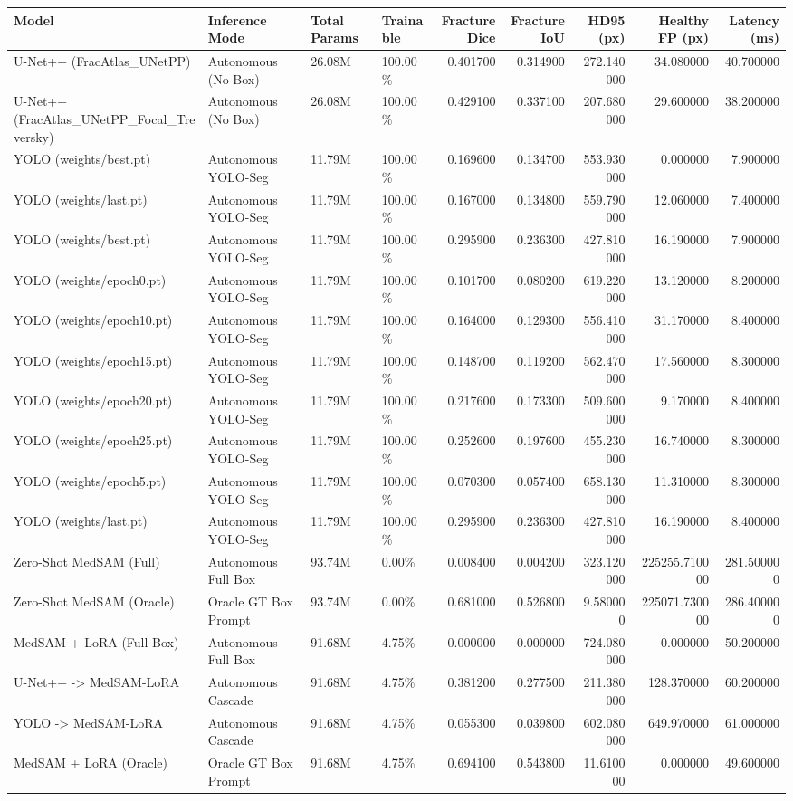 \begin{tabular}{llllrrrrr}
\toprule
Model & Inference Mode & Total Params & Trainable & Fracture Dice & Fracture IoU & HD95 (px) & Healthy FP (px) & Latency (ms) \\
\midrule
U-Net++ (FracAtlas\_UNetPP) & Autonomous (No Box) & 26.08M & 100.00\% & 0.401700 & 0.314900 & 272.140000 & 34.080000 & 40.700000 \\
U-Net++ (FracAtlas\_UNetPP\_Focal\_Treversky) & Autonomous (No Box) & 26.08M & 100.00\% & 0.429100 & 0.337100 & 207.680000 & 29.600000 & 38.200000 \\
YOLO (weights/best.pt) & Autonomous YOLO-Seg & 11.79M & 100.00\% & 0.169600 & 0.134700 & 553.930000 & 0.000000 & 7.900000 \\
YOLO (weights/last.pt) & Autonomous YOLO-Seg & 11.79M & 100.00\% & 0.167000 & 0.134800 & 559.790000 & 12.060000 & 7.400000 \\
YOLO (weights/best.pt) & Autonomous YOLO-Seg & 11.79M & 100.00\% & 0.295900 & 0.236300 & 427.810000 & 16.190000 & 7.900000 \\
YOLO (weights/epoch0.pt) & Autonomous YOLO-Seg & 11.79M & 100.00\% & 0.101700 & 0.080200 & 619.220000 & 13.120000 & 8.200000 \\
YOLO (weights/epoch10.pt) & Autonomous YOLO-Seg & 11.79M & 100.00\% & 0.164000 & 0.129300 & 556.410000 & 31.170000 & 8.400000 \\
YOLO (weights/epoch15.pt) & Autonomous YOLO-Seg & 11.79M & 100.00\% & 0.148700 & 0.119200 & 562.470000 & 17.560000 & 8.300000 \\
YOLO (weights/epoch20.pt) & Autonomous YOLO-Seg & 11.79M & 100.00\% & 0.217600 & 0.173300 & 509.600000 & 9.170000 & 8.400000 \\
YOLO (weights/epoch25.pt) & Autonomous YOLO-Seg & 11.79M & 100.00\% & 0.252600 & 0.197600 & 455.230000 & 16.740000 & 8.300000 \\
YOLO (weights/epoch5.pt) & Autonomous YOLO-Seg & 11.79M & 100.00\% & 0.070300 & 0.057400 & 658.130000 & 11.310000 & 8.300000 \\
YOLO (weights/last.pt) & Autonomous YOLO-Seg & 11.79M & 100.00\% & 0.295900 & 0.236300 & 427.810000 & 16.190000 & 8.400000 \\
Zero-Shot MedSAM (Full) & Autonomous Full Box & 93.74M & 0.00\% & 0.008400 & 0.004200 & 323.120000 & 225255.710000 & 281.500000 \\
Zero-Shot MedSAM (Oracle) & Oracle GT Box Prompt & 93.74M & 0.00\% & 0.681000 & 0.526800 & 9.580000 & 225071.730000 & 286.400000 \\
MedSAM + LoRA (Full Box) & Autonomous Full Box & 91.68M & 4.75\% & 0.000000 & 0.000000 & 724.080000 & 0.000000 & 50.200000 \\
U-Net++ -> MedSAM-LoRA & Autonomous Cascade & 91.68M & 4.75\% & 0.381200 & 0.277500 & 211.380000 & 128.370000 & 60.200000 \\
YOLO -> MedSAM-LoRA & Autonomous Cascade & 91.68M & 4.75\% & 0.055300 & 0.039800 & 602.080000 & 649.970000 & 61.000000 \\
MedSAM + LoRA (Oracle) & Oracle GT Box Prompt & 91.68M & 4.75\% & 0.694100 & 0.543800 & 11.610000 & 0.000000 & 49.600000 \\
\bottomrule
\end{tabular}
